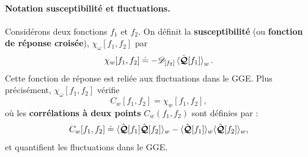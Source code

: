 


\medskip



\paragraph{Notation susceptibilité et fluctuations.}

Considérons deux fonctions $f_1$ et $f_2$. On définit la {\bf susceptibilité} (ou {\bf fonction de réponse croisée}), $\chi_\omega[f_1, f_2]$  par
\begin{equation}\label{chap4:eq.susceptibilite-fonctionnelle_2}
	\chi_w[f_1, f_2] \doteq - \mathscr{D}_{[f_2]}  \braket{\hat{\bm{\mathcal{Q}}}[f_1]}_w.
\end{equation}
Cette fonction de réponse est reliée aux fluctuations dans le \gls{GGE}. Plus précisément, $\chi_\omega[f_1, f_2]$ vérifie
\begin{equation}\label{chap4:eq.suscep.corre.1}
	C_w[f_1, f_2] = \chi_w[f_1, f_2],
\end{equation}
où les {\bf corrélations à deux points} $C_w(f_1, f_2)$ sont définies par :
\begin{equation}\label{chap4:eq.corre.1}
C_w[f_1, f_2] \doteq \langle \hat{\bm{\mathcal{Q}}}[f_1] \hat{\bm{\mathcal{Q}}}[f_2] \rangle_w - \langle \hat{\bm{\mathcal{Q}}}[f_1] \rangle_w \langle \hat{\bm{\mathcal{Q}}}[f_2] \rangle_w,
\end{equation}
et quantifient les fluctuations dans le \gls{GGE}.

